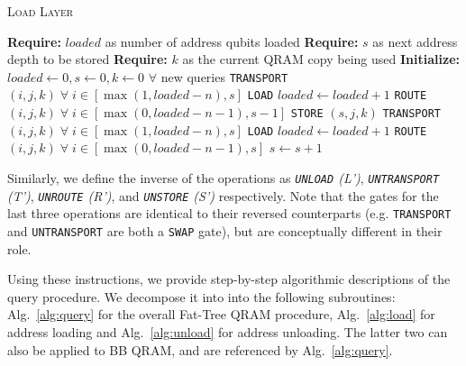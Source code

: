 \begin{algorithm}[t]
\caption{\textsc{Load Layer}}\label{alg:load}
\begin{algorithmic}[1]
    \State \textbf{Require: } $loaded$ as number of address qubits loaded
    \State \textbf{Require: }  $s$ as next address depth to be stored
    \State \textbf{Require: } $k$ as the current QRAM copy being used
    \State \textbf{Initialize: } $loaded \leftarrow 0, s \leftarrow 0, k \leftarrow 0$ $\forall$ new queries
    \newline    
    \Parallel
        \State \texttt{TRANSPORT} $(i, j, k) \; \forall \;i \in [\max(1, loaded - n), s]$
            \State \texttt{LOAD}
        \EndIf
    \EndParallel
    \State $loaded \leftarrow loaded + 1$
    \newline
    \Parallel
        \State \texttt{ROUTE} $(i, j, k)  \; \forall \;i \in [\max(0, loaded - n - 1), s - 1]$
        \State \texttt{STORE} $(s, j, k)$
    \EndParallel
    \newline
    \Parallel
        \State \texttt{TRANSPORT} $(i, j, k) \; \forall \; i \in [\max(1, loaded - n), s]$
            \State \texttt{LOAD}
        \EndIf
    \EndParallel
    \State $loaded \leftarrow loaded + 1$
    \newline
    \Parallel
        \State \texttt{ROUTE} $(i, j, k)   \; \forall \;i \in [\max(0, loaded - n - 1), s]$
    \EndParallel
    \State $s \leftarrow s + 1$
\end{algorithmic}
\end{algorithm}



Similarly, we define the inverse of the operations as \emph{\texttt{UNLOAD} (L')}, \emph{\texttt{UNTRANSPORT} (T')}, \emph{\texttt{UNROUTE} (R')}, and \emph{\texttt{UNSTORE} (S')} respectively. Note that the gates for the last three operations are identical to their reversed counterparts (e.g. \texttt{TRANSPORT} and \texttt{UNTRANSPORT} are both a \texttt{SWAP} gate), but are conceptually different in their role.

Using these instructions, we provide step-by-step algorithmic descriptions of the query procedure. We decompose it into into the following subroutines: Alg.~\ref{alg:query} for the overall Fat-Tree QRAM procedure, Alg.~\ref{alg:load} for address loading and Alg.~\ref{alg:unload} for address unloading. The latter two can also be applied to BB QRAM, and are referenced by Alg.~\ref{alg:query}.


